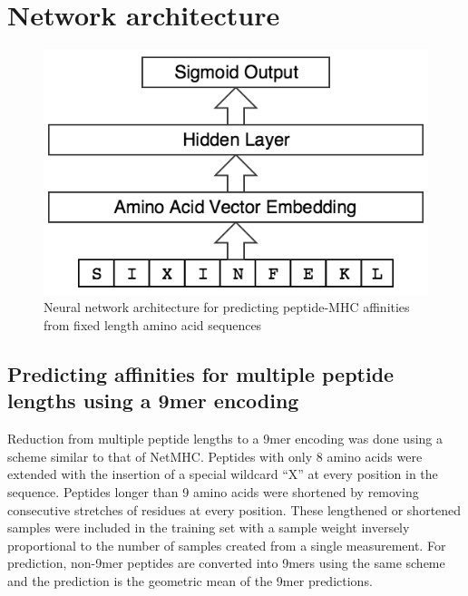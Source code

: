 
\section{Network architecture}

\begin{figure}[h]
\centering
\includegraphics[scale=0.5]{figures/mhcflurry-gliffy-network.png}
\caption{Neural network architecture for predicting peptide-MHC affinities from fixed length amino acid sequences}
\end{figure}

\subsection*{Predicting affinities for multiple peptide lengths using a 9mer encoding}
Reduction from multiple peptide lengths to a 9mer encoding was done using a scheme similar to that of NetMHC\cite{lundegaard2008accurate}. Peptides with only 8 amino acids were extended with the insertion of a special wildcard ``X'' at every position in the sequence. Peptides longer than 9 amino acids were shortened by removing consecutive stretches of residues at every position. These lengthened or shortened samples were included in the training set with a sample weight inversely proportional to the number of samples created from a single measurement. For prediction, non-9mer peptides are converted into 9mers using the same scheme and the prediction is the geometric mean of the 9mer predictions.